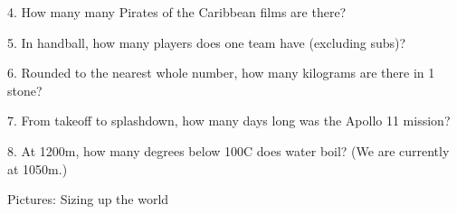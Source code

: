 \begin{frame}
\begin{center}
\Large
4. How many many Pirates of the Caribbean films are there?
\\
\end{center}
\end{frame}
\begin{frame}
\begin{center}
\Large
5. In handball, how many players does one team have (excluding subs)?
\\
\end{center}
\end{frame}
\begin{frame}
\begin{center}
\Large
6. Rounded to the nearest whole number, how many kilograms are there in 1 stone?
\\
\end{center}
\end{frame}
\begin{frame}
\begin{center}
\Large
7. From takeoff to splashdown, how many days long was the Apollo 11 mission?
\\
\end{center}
\end{frame}
\begin{frame}
\begin{center}
\Large
8. At 1200m, how many degrees below 100\textdegree C does water boil? (We are currently at 1050m.)
\\
\end{center}
\end{frame}
\begin{frame}
\begin{center}
\Huge
Pictures: Sizing up the world
\end{center}
\end{frame}
